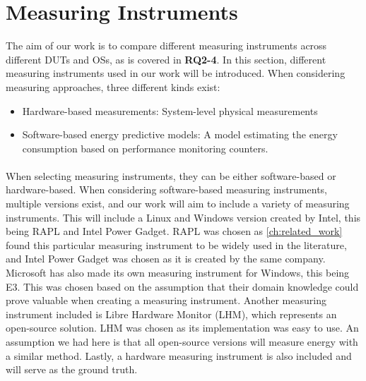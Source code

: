 \section{Measuring Instruments}\label{sec:measuring_instruments}

The aim of our work is to compare different measuring instruments across different DUTs and OSs, as is covered in \textbf{RQ2-4}. In this section, different measuring instruments used in our work will be introduced. When considering measuring approaches, three different kinds exist:

\begin{itemize}
    \item Hardware-based measurements: System-level physical measurements
    \item Software-based energy predictive models: A model estimating the energy consumption based on performance monitoring counters. %
\end{itemize}

\paragraph*{}
When selecting measuring instruments, they can be either software-based or hardware-based. When considering software-based measuring instruments, multiple versions exist, and our work will aim to include a variety of measuring instruments. This will include a Linux and Windows version created by Intel, this being RAPL and Intel Power Gadget. RAPL was chosen as \cref{ch:related_work} found this particular measuring instrument to be widely used in the literature, and Intel Power Gadget was chosen as it is created by the same company. Microsoft has also made its own measuring instrument for Windows, this being E3. This was chosen based on the assumption that their domain knowledge could prove valuable when creating a measuring instrument. Another measuring instrument included is Libre Hardware Monitor (LHM), which represents an open-source solution. LHM was chosen as its implementation was easy to use. An assumption we had here is that all open-source versions will measure energy with a similar method. Lastly, a hardware measuring instrument is also included and will serve as the ground truth.




